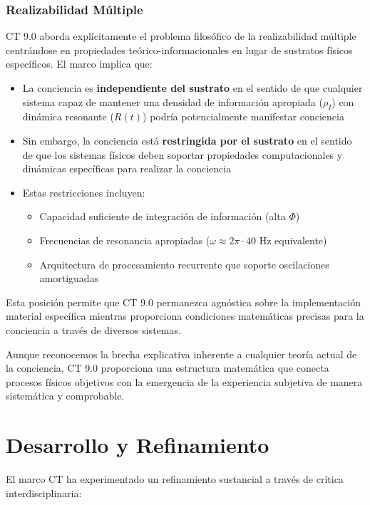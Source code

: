 \documentclass[12pt]{article}
\begin{document}
\subsubsection{Realizabilidad Múltiple}
CT 9.0 aborda explícitamente el problema filosófico de la realizabilidad múltiple \cite{putnam1967} centrándose en propiedades teórico-informacionales en lugar de sustratos físicos específicos. El marco implica que:

\begin{itemize}
    \item La conciencia es \textbf{independiente del sustrato} en el sentido de que cualquier sistema capaz de mantener una densidad de información apropiada ($\rho_I$) con dinámica resonante ($R(t)$) podría potencialmente manifestar conciencia
    
    \item Sin embargo, la conciencia está \textbf{restringida por el sustrato} en el sentido de que los sistemas físicos deben soportar propiedades computacionales y dinámicas específicas para realizar la conciencia
    
    \item Estas restricciones incluyen:
    \begin{itemize}[label=--]
        \item Capacidad suficiente de integración de información (alta $\Phi$)
        \item Frecuencias de resonancia apropiadas ($\omega \approx 2\pi \cdot 40$ Hz equivalente)
        \item Arquitectura de procesamiento recurrente que soporte oscilaciones amortiguadas
    \end{itemize}
\end{itemize}

Esta posición permite que CT 9.0 permanezca agnóstica sobre la implementación material específica mientras proporciona condiciones matemáticas precisas para la conciencia a través de diversos sistemas.

Aunque reconocemos la brecha explicativa inherente a cualquier teoría actual de la conciencia, CT 9.0 proporciona una estructura matemática que conecta procesos físicos objetivos con la emergencia de la experiencia subjetiva de manera sistemática y comprobable.

\section{Desarrollo y Refinamiento}
El marco CT ha experimentado un refinamiento sustancial a través de crítica interdisciplinaria:
\end{document}
